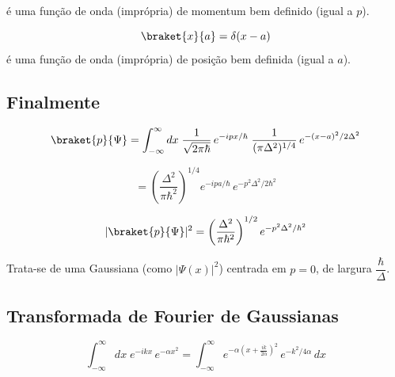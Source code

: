 é uma função de onda (imprópria) de momentum bem definido (igual a $p$).

\begin{equation}
    \braket{x}{a} = \delta(x-a)
\label{eq:aula12_braket_xa}
\end{equation}
é uma função de onda (imprópria) de posição bem definida (igual a $a$).

\subsection*{Finalmente}

\begin{equation}
    \braket{p}{\Psi} = \int_{-\infty}^{\infty} dx\; \frac{1}{\sqrt{2\pi\hbar}}\, e^{-ipx/\hbar}\; \frac{1}{(\pi\Delta^2)^{1/4}}\, e^{-(x-a)^2/2\Delta^2}
\label{eq:aula12_p_psi_integral}
\end{equation}

\begin{equation}
    = \left(\frac{\Delta^2}{\pi\hbar^2}\right)^{1/4} e^{-ipa/\hbar}\, e^{-p^2\Delta^2/2\hbar^2}
\label{eq:aula12_p_psi_resultado}
\end{equation}

\begin{equation}
    |\braket{p}{\Psi}|^2 = \left(\frac{\Delta^2}{\pi\hbar^2}\right)^{1/2} e^{-p^2\Delta^2/\hbar^2}
\label{eq:aula12_p_psi_quadrado}
\end{equation}

\begin{center}
\end{center}

Trata-se de uma Gaussiana (como $|\Psi(x)|^2$) centrada em $p=0$, de largura $\dfrac{\hbar}{\Delta}$.

\subsection*{Transformada de Fourier de Gaussianas}

\begin{equation}
    \int_{-\infty}^{\infty} dx\; e^{-ikx}\, e^{-\alpha x^2} = \int_{-\infty}^{\infty} e^{-\alpha\left(x+\frac{ik}{2\alpha}\right)^2}\, e^{-k^2/4\alpha}\, dx
\label{eq:aula12_fourier_gaussiana_1}
\end{equation}

